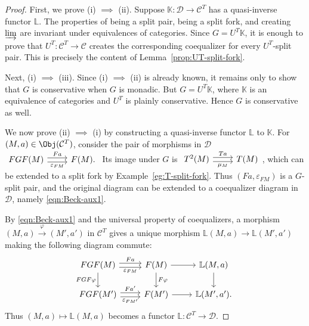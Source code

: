 \begin{proof}
	First, we prove (i) $\implies$ (ii). Suppose
	$\mathbb{K}:\mathcal{D}\to\mathcal{C}^T$ has a quasi-inverse functor
	$\mathbb{L}$. The properties of being a split pair, being a split fork,
	and creating $\varinjlim$ are invariant under equivalences of categories.
	Since $G=U^T\mathbb{K}$, it is enough to prove that
	$U^T:\mathcal{C}^T\to\mathcal{C}$ creates the corresponding coequalizer
	for every $U^T$-split pair. This is precisely the content of
	Lemma~\ref{prop:UT-split-fork}.

	Next, (i) $\implies$ (iii). Since (i) $\implies$ (ii) is already known, it
	remains only to show that $G$ is conservative when $G$ is monadic. But
	$G=U^T\mathbb{K}$, where $\mathbb{K}$ is an equivalence of categories and
	$U^T$ is plainly conservative. Hence $G$ is conservative as well.

	We now prove (ii) $\implies$ (i) by constructing a quasi-inverse functor
	$\mathbb{L}$ to $\mathbb{K}$. For $(M,a)\in\Obj(\mathcal{C}^T)$,
	consider the pair of morphisms in $\mathcal{D}$
	$\begin{tikzcd}
		FGF(M) \arrow[shift left, r, "Fa"] \arrow[shift right, r, "\varepsilon_{FM}"'] & F(M).
	\end{tikzcd}$
	Its image under $G$ is
	$\begin{tikzcd}
		T^2(M) \arrow[shift left, r, "Ta"] \arrow[shift right, r, "\mu_M"'] & T(M)
	\end{tikzcd}$\!,
	which can be extended to a split fork by
	Example~\ref{eg:T-split-fork}. Thus $(Fa,\varepsilon_{FM})$ is a
	$G$-split pair, and the original diagram can be extended to a coequalizer
	diagram in $\mathcal{D}$, namely \eqref{eqn:Beck-aux1}.

	By \eqref{eqn:Beck-aux1} and the universal property of coequalizers, a
	morphism $(M,a)\xrightarrow{\varphi}(M',a')$ in $\mathcal{C}^T$ gives a
	unique morphism $\mathbb{L}(M,a)\to\mathbb{L}(M',a')$ making the following
	diagram commute:
	\begin{equation*}\begin{tikzcd}
		FGF(M) \arrow[shift left, r, "Fa"] \arrow[shift right, r, "\varepsilon_{FM}"'] \arrow[d, "FGF\varphi"'] & F(M) \arrow[r] \arrow[d, "F\varphi"] & \mathbb{L}(M, a) \arrow[d] \\
		FGF(M') \arrow[shift left, r, "{Fa'}"] \arrow[shift right, r, "\varepsilon_{FM'}"'] & F(M') \arrow[r] & \mathbb{L}(M', a').
	\end{tikzcd}\end{equation*}
	Thus $(M,a)\mapsto\mathbb{L}(M,a)$ becomes a functor
	$\mathbb{L}:\mathcal{C}^T\to\mathcal{D}$.


\end{proof}
